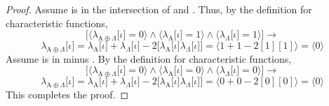 \documentclass[preview]{standalone}
\begin{document}
\begin{proof}
     Assume \bm{$\iota$} is in the intersection of  and \bm{$\Lambda$}.
    Thus, by the definition for characteristic functions,
    \begin{equation*}
        \bigg[
            \Big \langle \lambda_{\mathrm{A} \oplus \Lambda} \big[ \iota \big] = 0 \Big \rangle
                \land 
            \Big \langle \lambda_{\mathrm{A}} \big[ \iota \big] = 1 \Big \rangle
                \land 
            \Big \langle \lambda_{\Lambda} \big[ \iota \big] = 1 \Big \rangle
        \bigg]
            \rightarrow
    \end{equation*}
    \begin{equation*}
        \lambda_{\mathrm{A} \oplus \Lambda} \big[ \iota \big] 
            =
        \lambda_{\mathrm{A}} \big[ \iota \big] 
            + 
        \lambda_{\Lambda} \big[ \iota \big] 
            - 
        2 \Big[ \lambda_{\mathrm{A}} \big[ \iota \big] \lambda_{\Lambda} \big[ \iota \big] \Big]
            = 
        \Big \langle 1 + 1 - 2[1][1] \Big \rangle
            = 
        \Big \langle 0 \Big \rangle
    \end{equation*}
     Assume \bm{$\iota$} is in \bm{$\Omega$} minus .
    By the definition for characteristic functions, 
    \begin{equation*}
        \bigg[
            \Big \langle \lambda_{\mathrm{A} \oplus \Lambda} \big[ \iota \big] = 0 \Big \rangle
                \land 
            \Big \langle \lambda_{\mathrm{A}} \big[ \iota \big] = 0 \Big \rangle
                \land 
            \Big \langle \lambda_{\Lambda} \big[ \iota \big] = 0 \Big \rangle
        \bigg]
            \rightarrow
    \end{equation*}
    \begin{equation*}
        \lambda_{\mathrm{A} \oplus \Lambda} \big[ \iota \big] 
            =
        \lambda_{\mathrm{A}} \big[ \iota \big] 
            + 
        \lambda_{\Lambda} \big[ \iota \big] 
            - 
        2 \Big[ \lambda_{\mathrm{A}} \big[ \iota \big] \lambda_{\Lambda} \big[ \iota \big] \Big]
            = 
        \Big \langle 0 + 0 - 2[ 0 ] [ 0 ] \Big \rangle
            = 
        \Big \langle 0 \Big \rangle
    \end{equation*}
    This completes the proof.
\color{lightgray} \end{proof}
\end{document}
